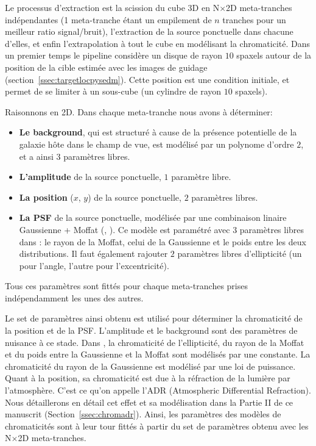 \documentclass[../main/main.tex]{subfiles}
\begin{document}
Le processus d'extraction est la scission du cube 3D en N$\times$2D
meta-tranches indépendantes (1 meta-tranche étant un empilement de $n$
tranches pour un meilleur ratio signal/bruit), l'extraction de la source ponctuelle dans chacune
d'elles, et enfin l'extrapolation à tout le cube en modélisant la
chromaticité.
Dans un premier temps le pipeline \pysedm considère un disque de rayon $10$
spaxels autour de la position de la cible estimée avec les images de
guidage (section~\ref{ssec:targetlocpysedm}). Cette position est une
condition initiale, et permet de se limiter à un sous-cube (un cylindre
de rayon $10$ spaxels).

Raisonnons en 2D. Dans chaque meta-tranche nous avons à déterminer:
\begin{itemize}[label=$\bullet$]
\itemsep0em 
\item \textbf{Le background}, qui est structuré à cause de la
  présence potentielle de la galaxie hôte dans le champ de vue, est
  modélisé par un polynome d'ordre $2$, et a ainsi $3$ paramètres libres. 
\item \textbf{L'amplitude} de la source ponctuelle, $1$ paramètre libre.
\item \textbf{La position} ($x$, $y$) de la source ponctuelle, $2$ paramètres libres.
\item \textbf{La PSF} de la source ponctuelle, modélisée par une
  combinaison linaire Gaussienne + Moffat (\citet{Butonthese},
  \citet{Buton2013}). Ce modèle est paramétré avec $3$ paramètres libres
  dans \citet{pysedm}: le rayon de la Moffat, celui de la Gaussienne et
  le poids entre les deux distributions. Il faut également rajouter $2$ paramètres libres
  d'ellipticité (un pour l'angle, l'autre pour l'excentricité).
\end{itemize}

Tous ces paramètres sont fittés pour chaque meta-tranches prises
indépendamment les unes des autres.

Le set de paramètres ainsi obtenu est utilisé pour déterminer la
chromaticité de la position et de la PSF. L'amplitude et
le background sont des paramètres de nuisance à ce stade.
Dans \pysedm, la chromaticité de l'ellipticité, du rayon de la Moffat et du poids entre la
Gaussienne et la Moffat sont modélisés par une constante. La
chromaticité du rayon de la
Gaussienne est modélisé par une loi de puissance.
Quant à la position, sa chromaticité est due à la réfraction de la
lumière par l'atmosphère. C'est ce qu'on appelle l'ADR (Atmospheric
Differential Refraction). Nous détaillerons en détail cet effet et sa
modélisation dans la
Partie II de ce manuscrit (Section~\ref{ssec:chromadr}).
Ainsi, les paramètres des modèles de chromaticités sont à leur tour
fittés à partir du set de paramètres obtenu avec les N$\times$2D
meta-tranches.
\end{document}
